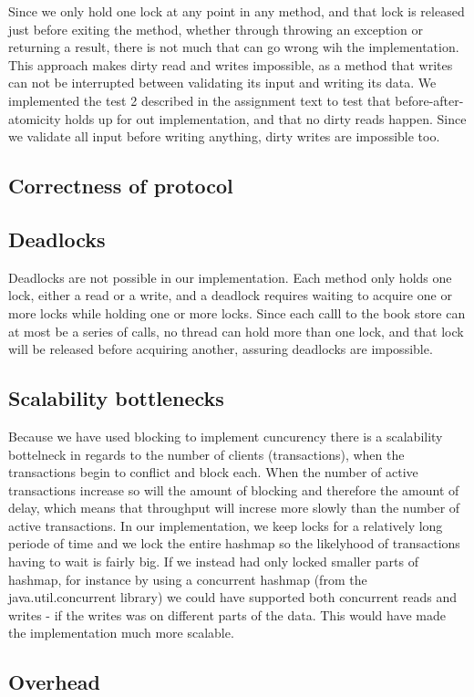 \documentclass{article}
\theoremstyle{plain}
\theoremstyle{nonumberplain}
\begin{document}
Since we only hold one lock at any point in any method, and that lock is released just before exiting the method, whether through throwing an exception or returning a result, there is not much that can go wrong wih the implementation. This approach makes dirty read and writes impossible, as a method that writes can not be interrupted between validating its input and writing its data. We implemented the test  2 described in the assignment text to test that before-after-atomicity holds up for out implementation, and that no dirty reads happen. Since we validate all input before writing anything, dirty writes are impossible too.

\subsection{Correctness of protocol}



\subsection{Deadlocks}

Deadlocks are not possible in our implementation. Each method only holds one lock, either a read or a write, and a deadlock requires waiting to acquire one or more locks while holding one or more locks. Since each calll to the book store can at most be a series of calls, no thread can hold more than one lock, and that lock will be released before acquiring another, assuring deadlocks are impossible.

\subsection{Scalability bottlenecks}
Because we have used blocking to implement cuncurency there is a scalability bottelneck in regards to the number of clients (transactions), when the transactions begin to conflict and block each. 
When the number of active transactions increase so will the amount of blocking and therefore the amount of delay, which means that throughput will increse more slowly than the number of active transactions. 
In our implementation, we keep locks for a relatively long periode of time and we lock the entire hashmap so the likelyhood of transactions having to wait is fairly big.
If we instead had only locked smaller parts of hashmap, for instance by using a concurrent hashmap (from the java.util.concurrent library) we could have supported both concurrent reads and writes - if the writes was on different parts of the data. This would have made the implementation much more scalable.

\subsection{Overhead}
\end{document}
